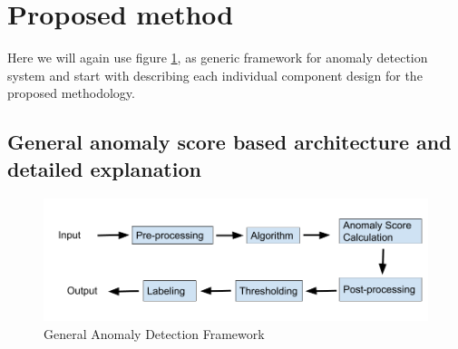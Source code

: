 \documentclass[12pt]{article}
\begin{document}
\section{Proposed method}
Here we will again use figure \ref{generalAnomalyDetectionFrameWork2}, as generic framework for anomaly detection system and start with describing each individual component design for the proposed methodology. 
\subsection{General anomaly score based architecture and detailed explanation}

\begin{figure}[H]
\centering
        \includegraphics[width=\textwidth]{images/generalAnomalyDetectionFrameWork.png}
    \caption{General Anomaly Detection Framework}
    \label{generalAnomalyDetectionFrameWork2}
\end{figure}
\end{document}
